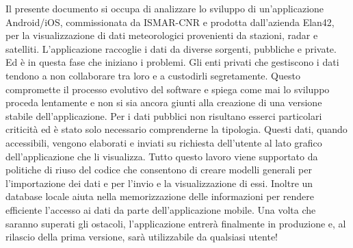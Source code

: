 Il presente documento si occupa di analizzare lo sviluppo di un'applicazione Android/iOS, commissionata da ISMAR-CNR e prodotta dall'azienda Elan42, per la visualizzazione di dati meteorologici provenienti da stazioni, radar e satelliti. L'applicazione raccoglie i dati da diverse sorgenti, pubbliche e private. Ed è in questa fase che iniziano i problemi. Gli enti privati che gestiscono i dati tendono a non collaborare tra loro e a custodirli segretamente. Questo compromette il processo evolutivo del software e spiega come mai lo sviluppo proceda lentamente e non si sia ancora giunti alla creazione di una versione stabile dell'applicazione. Per i dati pubblici non risultano esserci particolari criticità ed è stato solo necessario comprenderne la tipologia. Questi dati, quando accessibili, vengono elaborati e inviati su richiesta dell'utente al lato grafico dell'applicazione che li visualizza. Tutto questo lavoro viene supportato da politiche di riuso del codice che consentono di creare modelli generali per l'importazione dei dati e per l'invio e la visualizzazione di essi. Inoltre un database locale aiuta nella memorizzazione delle informazioni per rendere efficiente l'accesso ai dati da parte dell'applicazione mobile. Una volta che saranno superati gli ostacoli, l'applicazione entrerà finalmente in produzione e, al rilascio della prima versione, sarà utilizzabile da qualsiasi utente!